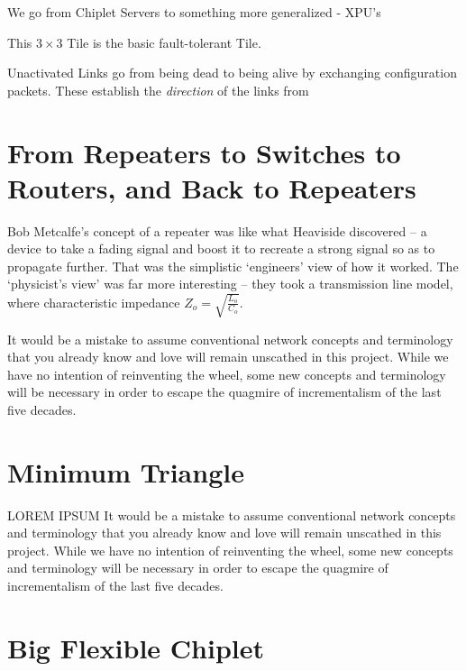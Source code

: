 \documentclass[../../../OAE-SPEC-MAIN.tex]{subfiles}
\begin{document}
We go from Chiplet Servers to something more generalized - XPU's 


This $3 \times 3$ Tile is the basic fault-tolerant Tile.


Unactivated Links go from being dead to being alive by exchanging configuration packets. These establish the \emph{direction} of the links from 

 
 
 \section{From Repeaters to Switches to Routers, and Back to Repeaters}
 
 Bob Metcalfe's concept of a repeater was like what Heaviside discovered -- a device to take a fading signal and boost it to recreate a strong signal so as to propagate further. That was the simplistic `engineers' view of how it worked.  The `physicist's view' was far more interesting -- they took a transmission line model, where characteristic impedance $Z_o = \sqrt{{\frac{L_o}{C_o}}}$. %
 
 It would be a mistake to assume conventional network concepts and terminology that you already know and love will remain unscathed in this project. While we have no intention of reinventing the wheel,  some new concepts and terminology will be necessary in order to escape the quagmire of incrementalism of the last five decades.  


 \section{Minimum Triangle}
 

LOREM IPSUM It would be a mistake to assume conventional network concepts and terminology that you already know and love will remain unscathed in this project. While we have no intention of reinventing the wheel,  some new concepts and terminology will be necessary in order to escape the quagmire of incrementalism of the last five decades.  



\section{Big Flexible Chiplet}
\end{document}
